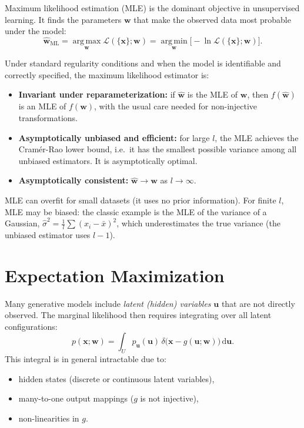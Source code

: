 \documentclass[11pt, oneside]{book}
\newcommand{\argmax}{\operatorname*{arg\,max}}
\newcommand{\argmin}{\operatorname*{arg\,min}}
\newcommand{\dd}{\,\mathrm{d}}
\newcommand{\wvec}{\bm{w}}
\newcommand{\what}{\hat{\bm{w}}}
\newcommand{\xvec}{\bm{x}}
\newcommand{\uvec}{\bm{u}}
\newcommand{\lhood}{\mathcal{L}}
\begin{document}
Maximum likelihood estimation (MLE) is the dominant objective in unsupervised learning.
It finds the parameters $\wvec$ that make the observed data most probable under the model:
\[
  \what_{\mathrm{ML}} = \argmax_{\wvec} \lhood(\{\xvec\};\wvec) = \argmin_{\wvec} \bigl[-\ln\lhood(\{\xvec\};\wvec)\bigr].
\]

\begin{thmbox}[title={Properties of the MLE}]
Under standard regularity conditions and when the model is identifiable and correctly
specified, the maximum likelihood estimator is:
\begin{itemize}
  \item \textbf{Invariant under reparameterization:} if $\hat{\wvec}$ is the MLE of
        $\wvec$, then $f(\hat{\wvec})$ is an MLE of $f(\wvec)$, with the usual care
        needed for non-injective transformations.
  \item \textbf{Asymptotically unbiased and efficient:} for large $l$, the MLE achieves
        the Cram\'{e}r-Rao lower bound, i.e.\ it has the smallest possible variance among
        all unbiased estimators. It is asymptotically optimal.
  \item \textbf{Asymptotically consistent:} $\what \to \wvec$ as $l \to \infty$.
\end{itemize}
\end{thmbox}

\begin{notebox}[title={MLE caveats}]
MLE can overfit for small datasets (it uses no prior information).
For finite $l$, MLE may be biased: the classic example is the MLE of the variance of a
Gaussian, $\hat{\sigma}^2 = \frac{1}{l}\sum(x_i - \bar{x})^2$, which underestimates
the true variance (the unbiased estimator uses $l-1$).
\end{notebox}


\section{Expectation Maximization}
\label{sec:em}

Many generative models include \emph{latent (hidden) variables} $\uvec$ that are not
directly observed.
The marginal likelihood then requires integrating over all latent configurations:
\[
  p(\xvec;\wvec) = \int_U p_{\uvec}(\uvec)\,\delta\!\bigl(\xvec-g(\uvec;\wvec)\bigr)\dd\uvec.
\]
This integral is in general intractable due to:
\begin{itemize}
  \item hidden states (discrete or continuous latent variables),
  \item many-to-one output mappings ($g$ is not injective),
  \item non-linearities in $g$.
\end{itemize}
\end{document}
